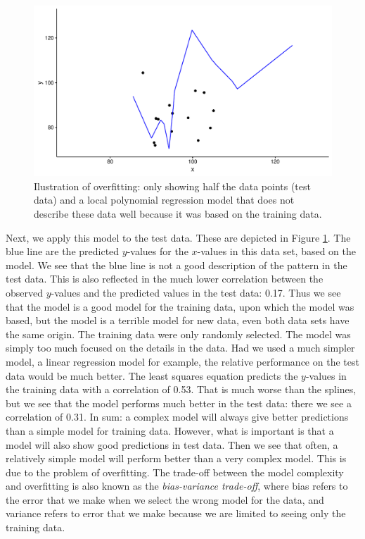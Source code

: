 \documentclass[]{book}\usepackage[]{graphicx}\usepackage[]{color}
\makeatletter
\def\maxwidth{ %
  \ifdim\Gin@nat@width>\linewidth
    \linewidth
  \else
    \Gin@nat@width
  \fi
}
\newenvironment{knitrout}{}{} %
\makeatother
\begin{document}
\begin{knitrout}
\color{fgcolor}\begin{figure}
\includegraphics[width=\maxwidth]{figure/overfitting_test-1} \caption[Ilustration of overfitting]{Ilustration of overfitting: only showing half the data points (test data) and a local polynomial regression model that does not describe these data well because it was based on the training data.}\label{fig:overfitting_test}
\end{figure}


\end{knitrout}

Next, we apply this model to the test data. These are depicted in Figure \ref{fig:overfitting_test}. The blue line are the predicted $y$-values for the $x$-values in this data set, based on the model. We see that the blue line is not a good description of the pattern in the test data. This is also reflected in the much lower correlation between the observed $y$-values and the predicted values in the test data: 0.17. Thus we see that the model is a good model for the training data, upon which the model was based, but the model is a terrible model for new data, even both data sets have the same origin. The training data were only randomly selected. The model was simply too much focused on the details in the data. Had we used a much simpler model, a linear regression model for example, the relative performance on the test data would be much better. The least squares equation predicts the $y$-values in the training data with a correlation of 0.53. That is much worse than the splines, but we see that the model performs much better in the test data: there we see a correlation of 0.31. 
In sum: a complex model will always give better predictions than a simple model for training data. However, what is important is that a model will also show good predictions in test data. Then we see that often, a relatively simple model will perform better than a very complex model. This is due to the problem of overfitting. The trade-off between the model complexity and overfitting is also known as the \textit{bias-variance trade-off}, where bias refers to the error that we make when we select the wrong model for the data, and variance refers to error that we make because we are limited to seeing only the training data.
\end{document}
